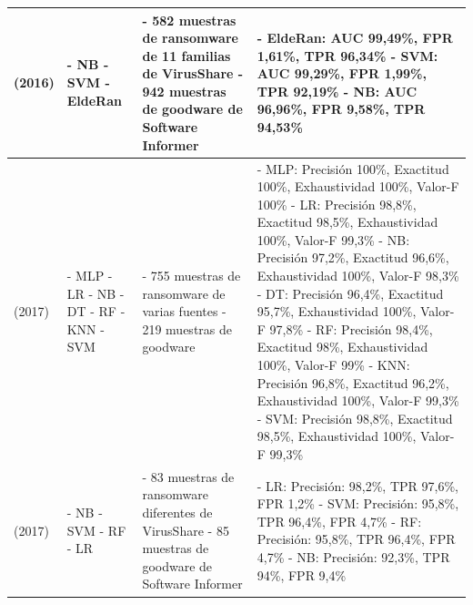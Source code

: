 {\begin{longtable}{|p{}|p{}|p{}|p{}|}
\cite{elderan} (2016)      & 
    - \gls{NB} \newline - \gls{SVM} \newline - EldeRan & 
    - 582 muestras de ransomware de 11 familias de VirusShare \newline - 942 muestras de goodware de Software Informer &
    - EldeRan: \gls{AUC} 99,49\%, \gls{FPR} 1,61\%, \gls{TPR} 96,34\% \newline - \gls{SVM}: \gls{AUC} 99,29\%, \gls{FPR} 1,99\%, \gls{TPR} 92,19\% \newline - \gls{NB}: \gls{AUC} 96,96\%, \gls{FPR} 9,58\%, \gls{TPR} 94,53\% \\ \hline
\cite{shallow} (2017)      & 
    - \gls{MLP} \newline - \gls{LR} \newline - \gls{NB} \newline - \gls{DT} \newline - \gls{RF} \newline - \gls{KNN} \newline - \gls{SVM} & 
    - 755  muestras  de  ransomware de varias fuentes \newline -  219 muestras de goodware &
    - \gls{MLP}: Precisión 100\%, Exactitud 100\%, Exhaustividad 100\%, Valor-F 100\% \newline - \gls{LR}: Precisión 98,8\%, Exactitud 98,5\%, Exhaustividad 100\%, Valor-F 99,3\% \newline - \gls{NB}: Precisión 97,2\%, Exactitud 96,6\%, Exhaustividad 100\%, Valor-F 98,3\% \newline - \gls{DT}: Precisión 96,4\%, Exactitud 95,7\%, Exhaustividad 100\%, Valor-F 97,8\% \newline - \gls{RF}: Precisión 98,4\%, Exactitud 98\%, Exhaustividad 100\%, Valor-F 99\% \newline - \gls{KNN}: Precisión 96,8\%, Exactitud 96,2\%, Exhaustividad 100\%, Valor-F 99,3\% \newline - \gls{SVM}: Precisión 98,8\%, Exactitud 98,5\%, Exhaustividad 100\%, Valor-F 99,3\% \\ \hline
\cite{flow} (2017)         & 
    - \gls{NB} \newline - \gls{SVM} \newline - \gls{RF} \newline - \gls{LR} & 
    - 83 muestras de ransomware diferentes de VirusShare \newline - 85 muestras de goodware de Software Informer &
    - \gls{LR}: Precisión: 98,2\%, \gls{TPR} 97,6\%, \gls{FPR} 1,2\% \newline - \gls{SVM}: Precisión: 95,8\%, \gls{TPR} 96,4\%, \gls{FPR} 4,7\% \newline - \gls{RF}: Precisión: 95,8\%, \gls{TPR} 96,4\%, \gls{FPR} 4,7\% \newline - \gls{NB}: Precisión: 92,3\%, \gls{TPR} 94\%, \gls{FPR} 9,4\% \\ \hline

\end{longtable}}
